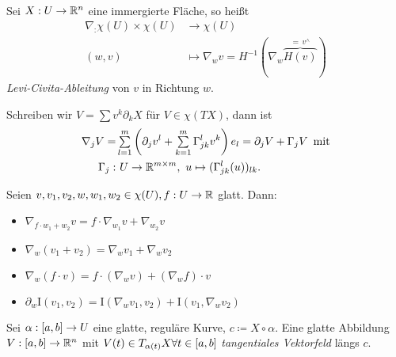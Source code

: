 \documentclass{cheat-sheet}
\newcommand{\FFI}{\mathrm{I}} %
\begin{document}
\begin{defn}\mbox{}\\
  Sei $X : U \to \mathbb{R}^n$ eine immergierte Fläche, so heißt
  \begin{align*}
    \nabla_ : \chi(U) \times \chi(U) &\to \chi(U) \\[-12pt]
    (w, v) &\mapsto \nabla_w v = H^{-1}(\nabla_w \overbrace{H(v)}^{=\,v^\wedge})
  \end{align*}
  \emph{Levi-Civita-Ableitung} von $v$ in Richtung $w$.
\end{defn}

\begin{bem}
  Schreiben wir $V = \sum v^k \partial_k X$ für $V \in \chi(TX)$, dann ist
  \begin{align*}
    \nabla_j V =& \sum_{l=1}^m \left( \partial_j v^l + \sum_{k=1}^m \Gamma_{jk}^l v^k \right) e_l = \partial_j V + \Gamma_j V \enspace \text{mit}\\
    \Gamma_j :& \,\, U \to \R^{m \times m}, \,\, u \mapsto (\Gamma_{jk}^l(u))_{lk}.
  \end{align*}
\end{bem}

\begin{satz}
  Seien $v, v_1, v_2, w, w_1, w_2 \in \chi(U), f : U \to \mathbb{R}$ glatt. Dann:
  \begin{itemize}
    \item $\nabla_{f \cdot w_1 + w_2} v = f \cdot \nabla_{w_1} v + \nabla_{w_2} v$ 
    \item $\nabla_w (v_1 + v_2) = \nabla_w v_1 + \nabla_w v_2$ 
    \item $\nabla_w (f \cdot v) = f \cdot (\nabla_w v) + (\nabla_w f) \cdot v$ 
    \item $\partial_w \FFI(v_1, v_2) = \FFI(\nabla_w v_1, v_2) + \FFI(v_1, \nabla_w v_2)$ 
  \end{itemize}
\end{satz}



\begin{defn}
  Sei $\alpha : \left[ a, b \right] \to U$ eine glatte, reguläre Kurve, $c \coloneqq X \circ \alpha$. Eine glatte Abbildung $V : \left[ a, b \right] \to \mathbb{R}^n$ mit $V(t) \in T_{\alpha(t)} X \forall t \in \left[ a, b \right]$ \emph{tangentiales Vektorfeld} längs $c$.
\end{defn}
\end{document}
